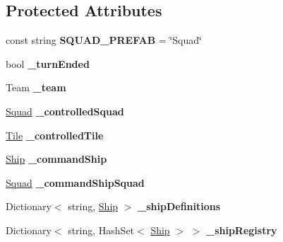 \subsection*{Protected Attributes}
\begin{DoxyCompactItemize}
\item 
\hypertarget{class_player_a219cc9a5227026d97d7a90779792e8d3}{}const string {\bfseries S\+Q\+U\+A\+D\+\_\+\+P\+R\+E\+F\+A\+B} = \char`\"{}Squad\char`\"{}\label{class_player_a219cc9a5227026d97d7a90779792e8d3}

\item 
\hypertarget{class_player_a7fb32a2fb262f0275fcbf5e9e5611135}{}bool {\bfseries \+\_\+turn\+Ended}\label{class_player_a7fb32a2fb262f0275fcbf5e9e5611135}

\item 
\hypertarget{class_player_a60515b3795a2f8263501dea634eb3cba}{}Team {\bfseries \+\_\+team}\label{class_player_a60515b3795a2f8263501dea634eb3cba}

\item 
\hypertarget{class_player_aef41a5a7f0c3e188b2f85297aa89fb82}{}\hyperlink{class_squad}{Squad} {\bfseries \+\_\+controlled\+Squad}\label{class_player_aef41a5a7f0c3e188b2f85297aa89fb82}

\item 
\hypertarget{class_player_ac6a2a6bea4fa090127350ce8400aa36a}{}\hyperlink{class_tile}{Tile} {\bfseries \+\_\+controlled\+Tile}\label{class_player_ac6a2a6bea4fa090127350ce8400aa36a}

\item 
\hypertarget{class_player_a3971954dd35d1e5b243fa45e4874b90e}{}\hyperlink{class_ship}{Ship} {\bfseries \+\_\+command\+Ship}\label{class_player_a3971954dd35d1e5b243fa45e4874b90e}

\item 
\hypertarget{class_player_ab06a9eef34081d8c1f05ce0974032631}{}\hyperlink{class_squad}{Squad} {\bfseries \+\_\+command\+Ship\+Squad}\label{class_player_ab06a9eef34081d8c1f05ce0974032631}

\item 
\hypertarget{class_player_a7eb018243d5737a533f1686a704c0e4d}{}Dictionary$<$ string, \hyperlink{class_ship}{Ship} $>$ {\bfseries \+\_\+ship\+Definitions}\label{class_player_a7eb018243d5737a533f1686a704c0e4d}

\item 
\hypertarget{class_player_ab03194e95cb1287203c4a8b3bfd2cda5}{}Dictionary$<$ string, Hash\+Set$<$ \hyperlink{class_ship}{Ship} $>$ $>$ {\bfseries \+\_\+ship\+Registry}\label{class_player_ab03194e95cb1287203c4a8b3bfd2cda5}


\end{DoxyCompactItemize}
